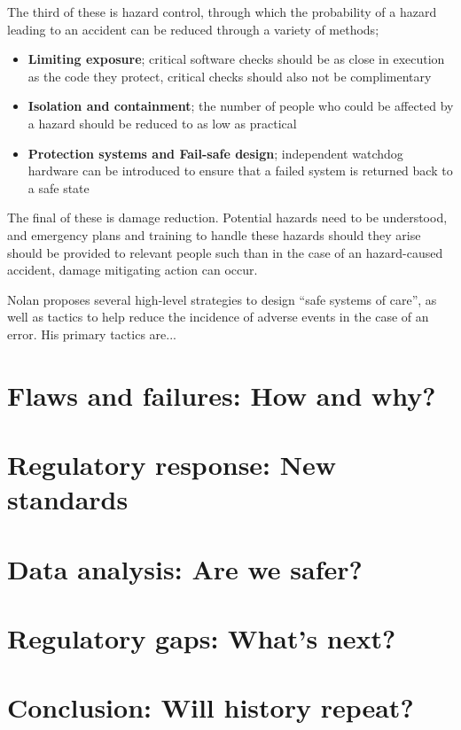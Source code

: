 \documentclass{cshonours}
\begin{document}
The third of these is hazard control, through which the probability of a hazard leading to an accident can be reduced through a variety of methods;
 \begin{itemize}
  \item \textbf{Limiting exposure}; critical software checks should be as close in execution as the code they protect, critical checks should also not be complimentary
  \item \textbf{Isolation and containment}; the number of people who could be affected by a hazard should be reduced to as low as practical
  \item \textbf{Protection systems and Fail-safe design}; independent watchdog hardware can be introduced to ensure that a failed system is returned back to a safe state
 \end{itemize}

The final of these is damage reduction. Potential hazards need to be understood, and emergency plans and training to handle these hazards should they arise should be provided to relevant people such than in the case of an hazard-caused accident, damage mitigating action can occur.

Nolan \cite{nolan2000system} proposes several high-level strategies to design ``safe systems of care'', as well as tactics to help reduce the incidence of adverse events in the case of an error. His primary tactics are...

\chapter{Flaws and failures: How and why?}
\label{chap:flawsfailures}

\chapter{Regulatory response: New standards}
\label{chap:newstandards}

\chapter{Data analysis: Are we safer?}
\label{chap:data}

\chapter{Regulatory gaps: What's next?}
\label{chap:reggaps}

\chapter{Conclusion: Will history repeat?}
\label{chap:conclusion}


\appendix


\end{document}
